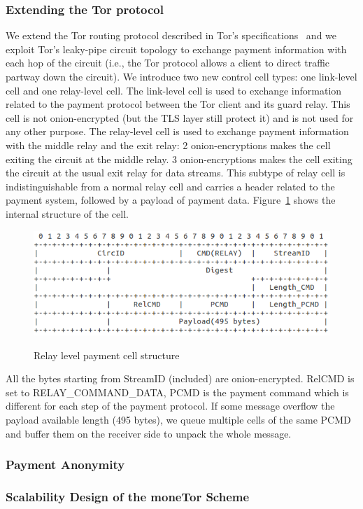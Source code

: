 \subsubsection{Extending the Tor protocol}
We extend the Tor routing protocol described in Tor's specifications~\cite{torspec} and we exploit Tor's leaky-pipe circuit topology to exchange payment information with each hop of the circuit (i.e., the Tor protocol allows a client to direct traffic partway down the circuit). We introduce two new control cell types: one link-level cell and one relay-level cell. The link-level cell is used to exchange information related to the payment protocol between the Tor client and its guard relay. This cell is not onion-encrypted (but the TLS layer still protect it) and is not used for any other purpose. The relay-level cell is used to exchange payment information with the middle relay and the exit relay: 2 onion-encryptions makes the cell exiting the circuit at the middle relay. 3 onion-encryptions makes the cell exiting the circuit at the usual exit relay for data streams. This subtype of relay cell is indistinguishable from a normal relay cell and carries a header related to the payment system, followed by a payload of payment data. Figure~\ref{fig:relay_command_mt_structure} shows the internal structure of the cell.

\begin{figure}[h]
	\centering
	\includegraphics[scale=0.38]{images/payment_cell_header.png}
	\label{fig:relay_command_mt_structure}
	\caption{Relay level payment cell structure}
\end{figure}

All the bytes starting from StreamID (included) are onion-encrypted. RelCMD is set to RELAY\_COMMAND\_DATA, PCMD is the payment command which is different for each step of the payment protocol. If some message overflow the payload available length (495 bytes), we queue multiple cells of the same PCMD and buffer them on the receiver side to unpack the whole message.

\subsubsection{Payment Anonymity}

\subsubsection{Scalability Design of the moneTor Scheme}